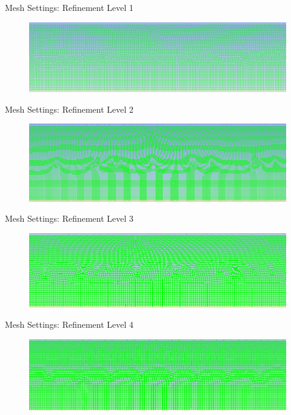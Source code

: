 \begin{frame}{Mesh Settings: Refinement Level 1}
  \begin{figure}[h]
    \centering
    \includegraphics[width=1\textwidth]{images/MeshRef1.png}
    \label{fig:meshrefinement1}
  \end{figure}
\end{frame}

\begin{frame}{Mesh Settings: Refinement Level 2}
    \begin{figure}[h]
    \centering
    \includegraphics[width=1\textwidth]{images/MeshRef2.png}
    \label{fig:meshrefinement2}
  \end{figure}
\end{frame}

\begin{frame}{Mesh Settings: Refinement Level 3}
    \begin{figure}[h]
    \centering
    \includegraphics[width=1\textwidth]{images/MeshRef3.PNG}
    \label{fig:meshrefinement3}
  \end{figure}
\end{frame}

\begin{frame}{Mesh Settings: Refinement Level 4}
    \begin{figure}[h]
    \centering
    \includegraphics[width=1\textwidth]{images/MeshRef4.PNG}
    \label{fig:meshrefinement4}
  \end{figure}
\end{frame}

